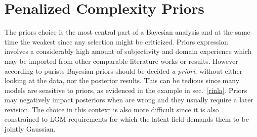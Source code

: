 \documentclass[
  12pt,
  a4paper,
  oneside]{book}
\theoremstyle{definition}
\theoremstyle{definition}
\theoremstyle{definition}
\theoremstyle{remark}
\begin{document}
\hypertarget{priorsspec}{%
\section{Penalized Complexity Priors}\label{priorsspec}}

The priors choice is the most central part of a Bayesian analysis and at the same time the weakest since any selection might be criticized. Priors expression involves a considerably high amount of subjectivity and domain experience which may be imported from other comparable literature works or results. However according to purists Bayesian priors should be decided \emph{a-priori}, without either looking at the data, nor the posterior results. This can be tedious since many models are sensitive to priors, as evidenced in the example in sec.~\ref{rinla}. Priors may negatively impact posteriors when are
wrong and they usually require a later revision. The choice in this context is also more difficult since it is also constrained to LGM requirements for which the latent field demands them to be jointly Gaussian.
\end{document}
